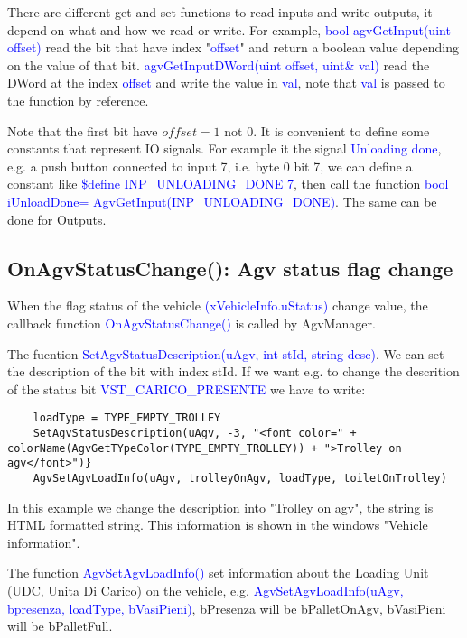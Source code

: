 There are different get and set functions to read inputs and write outputs, it depend on what and how we read or write. For example, \textcolor{blue}{bool agvGetInput(uint offset)} read the bit that have index "\textcolor{blue}{offset}" and return a boolean value depending on the value of that bit. \textcolor{blue}{agvGetInputDWord(uint offset, uint\& val)} read the DWord at the index \textcolor{blue}{offset} and write the value in \textcolor{blue}{val}, note that \textcolor{blue}{val} is passed to the function by reference.

Note that the first bit have $offset = 1$ not $0$. It is convenient to define some constants that represent IO signals. For example it the signal \textcolor{blue}{Unloading done}, e.g. a push button connected to input 7, i.e. byte 0 bit 7, we can define a constant like \textcolor{blue}{\$define INP\_UNLOADING\_DONE 7}, then call the function \textcolor{blue}{bool iUnloadDone= AgvGetInput(INP\_UNLOADING\_DONE)}. The same can be done for Outputs.


%
\subsection{OnAgvStatusChange(): Agv status flag change}
When the flag status of the vehicle \textcolor{blue}{(xVehicleInfo.uStatus)} change value, the callback function \textcolor{blue}{OnAgvStatusChange()} is called by AgvManager.

The fucntion \textcolor{blue}{SetAgvStatusDescription(uAgv, int stId, string desc)}. We can set the description of the bit with index stId.
If we want e.g. to change the descrition of the status bit \textcolor{blue}{VST\_CARICO\_PRESENTE} we have to write: 
\begin{lstlisting}
	loadType = TYPE_EMPTY_TROLLEY
	SetAgvStatusDescription(uAgv, -3, "<font color=" + colorName(AgvGetTYpeColor(TYPE_EMPTY_TROLLEY)) + ">Trolley on agv</font>")}
	AgvSetAgvLoadInfo(uAgv, trolleyOnAgv, loadType, toiletOnTrolley)
\end{lstlisting}

In this example we change the description into "Trolley on agv", the string is HTML formatted string. This information is shown in the windows "Vehicle information".

The function \textcolor{blue}{AgvSetAgvLoadInfo()} set information about the Loading Unit (UDC, Unita Di Carico) on the vehicle, e.g. \textcolor{blue}{AgvSetAgvLoadInfo(uAgv, bpresenza, loadType, bVasiPieni)}, bPresenza will be bPalletOnAgv, bVasiPieni will be bPalletFull.

